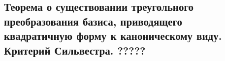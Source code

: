 {
\subsection{Теорема о существовании треугольного преобразования базиса, приводящего квадратичную форму к каноническому виду. Критерий Сильвестра.  ?????}
}